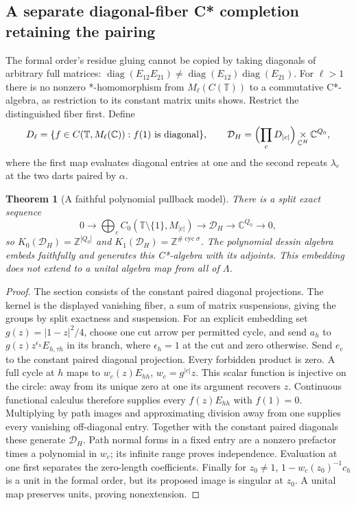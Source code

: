 \documentclass[11pt]{article}
\newtheorem{theorem}{Theorem}[section]
\theoremstyle{definition}\newtheorem{definition}[theorem]{Definition}
\theoremstyle{remark}\newtheorem{remark}[theorem]{Remark}
\newcommand{\C}{\mathbb C}\newcommand{\Z}{\mathbb Z}\newcommand{\R}{\mathbb R}
\begin{document}
\subsection{A separate diagonal-fiber C* completion retaining the pairing}
The formal order's residue gluing cannot be copied by taking diagonals of arbitrary full matrices: $\operatorname{diag}(E_{12}E_{21})\ne\operatorname{diag}(E_{12})\operatorname{diag}(E_{21})$. For $\ell>1$ there is no nonzero *-homomorphism from $M_\ell(C(\mathbb T))$ to a commutative C*-algebra, as restriction to its constant matrix units shows. Restrict the distinguished fiber first. Define
\[
 D_\ell=\{f\in C(\mathbb T,M_\ell(\C)):f(1)\text{ is diagonal}\},\qquad
 \mathcal D_H=\Bigl(\prod_cD_{|c|}\Bigr)\mathop{\times}_{\C^H}\C^{Q_0},
\]
where the first map evaluates diagonal entries at one and the second repeats $\lambda_e$ at the two darts paired by $\alpha$.
\begin{theorem}[A faithful polynomial pullback model]\label{thm:diagonalmodel}
There is a split exact sequence
\[
 0\to\bigoplus_c C_0(\mathbb T\setminus\{1\},M_{|c|})
 \to\mathcal D_H\to\C^{Q_0}\to0,
\]
so $K_0(\mathcal D_H)=\Z^{|Q_0|}$ and $K_1(\mathcal D_H)=\Z^{\#\operatorname{cyc}\sigma}$. The polynomial dessin algebra embeds faithfully and generates this C*-algebra with its adjoints. This embedding does not extend to a unital algebra map from all of $\Lambda$.
\end{theorem}
\begin{proof}
The section consists of the constant paired diagonal projections. The kernel is the displayed vanishing fiber, a sum of matrix suspensions, giving the groups by split exactness and suspension. For an explicit embedding set $g(z)=|1-z|^2/4$, choose one cut arrow per permitted cycle, and send $a_h$ to $g(z)z^{\epsilon_h}E_{h,\tau h}$ in its branch, where $\epsilon_h=1$ at the cut and zero otherwise. Send $e_e$ to the constant paired diagonal projection. Every forbidden product is zero. A full cycle at $h$ maps to $w_c(z)E_{hh}$, $w_c=g^{|c|}z$. This scalar function is injective on the circle: away from its unique zero at one its argument recovers $z$. Continuous functional calculus therefore supplies every $f(z)E_{hh}$ with $f(1)=0$. Multiplying by path images and approximating division away from one supplies every vanishing off-diagonal entry. Together with the constant paired diagonals these generate $\mathcal D_H$. Path normal forms in a fixed entry are a nonzero prefactor times a polynomial in $w_c$; its infinite range proves independence. Evaluation at one first separates the zero-length coefficients. Finally for $z_0\ne1$, $1-w_c(z_0)^{-1}c_h$ is a unit in the formal order, but its proposed image is singular at $z_0$. A unital map preserves units, proving nonextension.
\end{proof}
\end{document}
